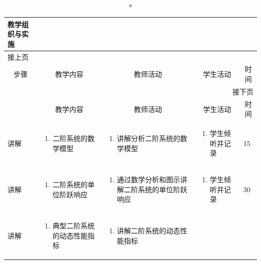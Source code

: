 {%
\begin{landscape}

\begin{longtable}{|m{10mm}|m{50mm}|m{50mm}|m{50mm}|m{15mm}|}
\caption*{\huge 教学组织与实施}\\
\hline
\endfirsthead
\multicolumn{5}{l}{\small 接上页}\\
\hline
\multicolumn{1}{|c|}{步骤}&\multicolumn{1}{c|}{教学内容}&\multicolumn{1}{c|}{教师活动}&\multicolumn{1}{c|}{学生活动}&\multicolumn{1}{c|}{时间}\\
\hline
\endhead

\multicolumn{5}{r}{\small 接下页}\\
\endfoot
\hline
\endlastfoot
\multicolumn{1}{|c|}{步骤}&\multicolumn{1}{c|}{教学内容}&\multicolumn{1}{c|}{教师活动}&\multicolumn{1}{c|}{学生活动}&\multicolumn{1}{c|}{时间}\\\hline
讲解&\begin{enumerate}
\item 二阶系统的数学模型
\end{enumerate} &\begin{enumerate}
\item 讲解分析二阶系统的数学模型
\end{enumerate} &\begin{enumerate}
\item 学生倾听并记录
\end{enumerate} &15 \\\hline
讲解&\begin{enumerate}
\item 二阶系统的单位阶跃响应
\end{enumerate}
 &\begin{enumerate}
\item 通过数学分析和图示讲解二阶系统的单位阶跃响应
\end{enumerate} &\begin{enumerate}
\item 学生倾听并记录
\end{enumerate} &30 \\\hline
讲解&\begin{enumerate}
\item 典型二阶系统的动态性能指标
\end{enumerate}
&\begin{enumerate}
\item 讲解二阶系统的动态性能指标
\end{enumerate} &\begin{enumerate}

\end{enumerate}
\end{longtable}
\end{landscape}}
